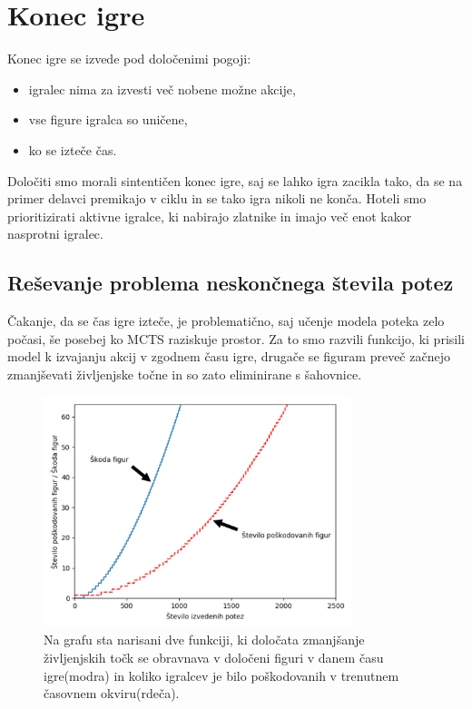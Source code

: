 \documentclass[a4paper, 12pt]{book}
\begin{document}
\section{Konec igre}
\label{sKonecIgre}
Konec igre se izvede pod določenimi pogoji:
\begin{itemize}
	\item igralec nima za izvesti več nobene možne akcije,
	\item vse figure igralca so uničene,
	\item ko se izteče čas.
\end{itemize}

Določiti smo morali sintentičen konec igre, saj se lahko igra zacikla tako, da se na primer delavci premikajo v ciklu in se tako igra nikoli ne konča.
Hoteli smo prioritizirati aktivne igralce, ki nabirajo zlatnike in imajo več enot kakor nasprotni igralec.

\subsection{Reševanje problema neskončnega števila potez}
\label{sKillFunction}
Čakanje, da se čas igre izteče, je problematično, saj učenje modela poteka zelo počasi, še posebej ko MCTS raziskuje prostor.
Za to smo razvili funkcijo, ki prisili model k izvajanju akcij v zgodnem času igre, drugače se figuram preveč začnejo zmanjševati življenjske točne in so zato eliminirane s šahovnice.


\begin{figure}[h]
	\begin{center}
		\includegraphics[width=0.8\textwidth]{photos/destroy_formula_2018_11_17.pdf}
	\end{center}
	\caption{Na grafu sta narisani dve funkciji, ki določata zmanjšanje življenjskih točk se obravnava v določeni figuri v danem času igre(modra) in koliko igralcev je bilo poškodovanih v trenutnem časovnem okviru(rdeča).}
	\label{destroy_formula_2018_11_17}
\end{figure}
\end{document}
